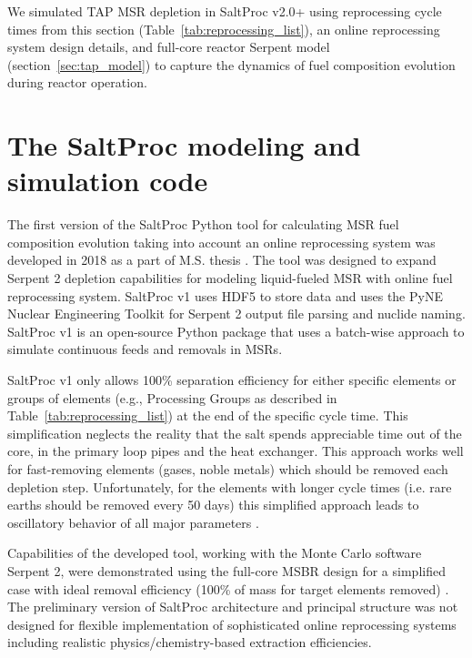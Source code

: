 \documentclass[12pt]{article} %
\begin{document}
We simulated \gls{TAP} \gls{MSR} depletion in SaltProc v2.0+ using  
reprocessing cycle times from 
this section (Table~\ref{tab:reprocessing_list}), an online reprocessing 
system design details, and full-core reactor Serpent model 
(section~\ref{sec:tap_model})
 to capture the dynamics of fuel composition evolution during reactor operation.

\section{The SaltProc modeling and simulation code} \label{sec:tool}
The first version of the SaltProc Python tool for calculating \gls{MSR} fuel 
composition evolution taking into account an online reprocessing system 
was developed in 2018 as a part of M.S. thesis \cite{rykhlevskii_advanced_2018,
rykhlevskii_arfc/saltproc_2018}. The tool was designed to 
expand Serpent 2 depletion capabilities for modeling liquid-fueled \gls{MSR} 
with online fuel reprocessing system. SaltProc v1 uses HDF5 
\cite{the_hdf_group_hierarchical_1997} to store 
data and uses the PyNE Nuclear Engineering Toolkit \cite{scopatz_pyne_2012}
for Serpent 2 output file parsing and nuclide naming. SaltProc v1 is an 
open-source Python package that uses a batch-wise approach to simulate 
continuous feeds and removals in \glspl{MSR}. 

SaltProc v1 only allows 100\% separation efficiency for 
either specific elements or groups of elements (e.g., Processing Groups as described in 
Table~\ref{tab:reprocessing_list}) at the end of the specific cycle time. 
This simplification neglects the reality that the salt spends appreciable time 
out of the core, in the primary loop pipes and the heat exchanger. This approach 
works well for fast-removing elements (gases, noble metals) 
which should be removed each depletion step. Unfortunately, 
for the elements with longer cycle times (i.e. rare earths should be removed 
every 50 days) this simplified approach leads to oscillatory behavior of all
major parameters \cite{rykhlevskii_modeling_2019}. 

Capabilities of the developed tool, working with the Monte Carlo software 
Serpent 2, were demonstrated using the full-core MSBR design for a 
simplified case with ideal removal efficiency (100\% of mass for target 
elements removed) \cite{rykhlevskii_modeling_2019}. The preliminary version of 
SaltProc architecture and principal structure was not designed for 
flexible implementation of sophisticated online reprocessing systems 
including realistic physics/chemistry-based extraction efficiencies. 
\end{document}
